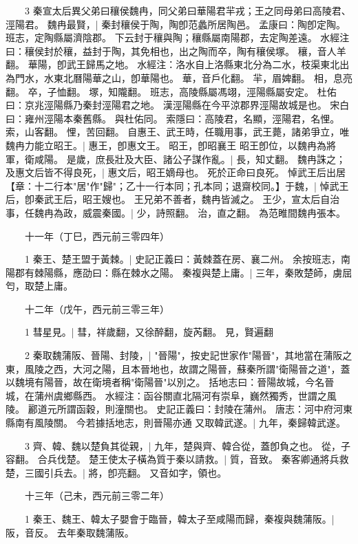 　　3 秦宣太后異父弟曰穰侯魏冉，同父弟曰華陽君羋戎；王之同母弟曰高陵君、涇陽君。
	魏冉最賢，|{
	秦封穰侯于陶，陶卽范蠡所居陶邑。
	孟康曰：陶卽定陶。
	班志，定陶縣屬濟陰郡。
	下云封于穰與陶；穰縣屬南陽郡，去定陶差遠。
	水經注曰：穰侯封於穰，益封于陶，其免相也，出之陶而卒，陶有穰侯塚。
	穰，音人羊翻。
	華陽，卽武王歸馬之地。
	水經注：洛水自上洛縣東北分為二水，枝渠東北出為門水，水東北曆陽華之山，卽華陽也。
	華，音戶化翻。
	羋，眉婢翻。
	相，息亮翻。
	卒，子恤翻。
	塚，知隴翻。
	班志，高陵縣屬馮翊，涇陽縣屬安定。
	杜佑曰：京兆涇陽縣乃秦封涇陽君之地。
	漢涇陽縣在今平涼郡界涇陽故城是也。
	宋白曰：雍州涇陽本秦舊縣。
	與杜佑同。
	索隱曰：高陵君，名顯，涇陽君，名悝。
	索，山客翻。
	悝，苦回翻。
}
自惠王、武王時，任職用事，武王薨，諸弟爭立，唯魏冉力能立昭王。|{
	惠王，卽惠文王。
	昭王，卽昭襄王
	}
昭王卽位，以魏冉為將軍，衛咸陽。
	是歲，庶長壯及大臣、諸公子謀作亂。|{
	長，知丈翻。
}
魏冉誅之；及惠文后皆不得良死，|{
	惠文后，昭王嫡母也。
	死於正命曰良死。
}
悼武王后出居【章：十二行本"居"作"歸"；乙十一行本同；孔本同；退齋校同。】于魏，|{
	悼武王后，卽秦武王后，昭王嫂也。
}
王兄弟不善者，魏冉皆滅之。
	王少，宣太后自治事，任魏冉為政，威震秦國。|{
	少，詩照翻。
	治，直之翻。
	為范睢間魏冉張本。
}

　　十一年（丁巳，西元前三零四年）

　　1 秦王、楚王盟于黃棘。|{
	史記正義曰：黃棘蓋在房、襄二州。
	余按班志，南陽郡有棘陽縣，應劭曰：縣在棘水之陽。
}
秦複與楚上庸。|{
	三年，秦敗楚師，虜屈匄，取楚上庸。
}

　　十二年（戊午，西元前三零三年）

　　1 彗星見。|{
	彗，祥歲翻，又徐醉翻，旋芮翻。
	見，賢遍翻
	}

　　2 秦取魏蒲阪、晉陽、封陵，|{
	"晉陽"，按史記世家作"陽晉"，其地當在蒲阪之東，風陵之西，大河之陽，且本晉地也，故謂之陽晉，蘇秦所謂"衛陽晉之道"，蓋以魏境有陽晉，故在衛境者稱"衛陽晉"以別之。
	括地志曰：晉陽故城，今名晉城，在蒲州虞鄉縣西。
	水經注：函谷關直北隔河有崇阜，巍然獨秀，世謂之風陵。
	酈道元所謂函穀，則潼關也。
	史記正義曰：封陵在蒲州。
	唐志：河中府河東縣南有風陵關。
	今若據括地志，則晉陽亦通
	}
又取韓武遂。|{
	九年，秦歸韓武遂。
}

　　3 齊、韓、魏以楚負其從親，|{
	九年，楚與齊、韓合從，蓋卽負之也。
	從，子容翻。
}
合兵伐楚。
	楚王使太子橫為質于秦以請救。|{
	質，音致。
}
秦客卿通將兵救楚，三國引兵去。|{
	將，卽亮翻。
	又音如字，領也。
}

　　十三年（己未，西元前三零二年）

　　1 秦王、魏王、韓太子嬰會于臨晉，韓太子至咸陽而歸，秦複與魏蒲阪。|{
	阪，音反。
	去年秦取魏蒲阪。
}

